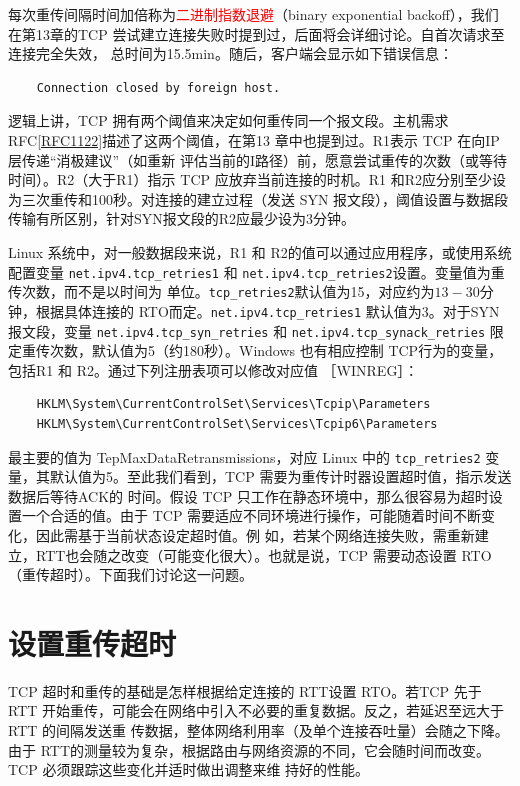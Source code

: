每次重传间隔时间加倍称为\textcolor{red}{二进制指数退避}（binary exponential backoff），我们在第13章的TCP 尝试建立连接失败时提到过，后面将会详细讨论。自首次请求至连接完全失效，
总时间为15.5min。随后，客户端会显示如下错误信息：
\begin{verbatim}
    Connection closed by foreign host.
\end{verbatim}

逻辑上讲，TCP 拥有两个阈值来决定如何重传同一个报文段。主机需求 RFC\href{https://www.rfc-editor.org/rfc/rfc1122}{[RFC1122]}描述了这两个阈值，在第13 章中也提到过。R1表示 TCP 在向IP 层传递“消极建议”（如重新
评估当前的I路径）前，愿意尝试重传的次数（或等待时间）。R2（大于R1）指示 TCP 应放弃当前连接的时机。R1 和R2应分别至少设为三次重传和100秒。对连接的建立过程（发送
SYN 报文段），阈值设置与数据段传输有所区别，针对SYN报文段的R2应最少设为3分钟。

Linux 系统中，对一般数据段来说，R1 和 R2的值可以通过应用程序，或使用系统配置变量 \verb|net.ipv4.tcp_retries1| 和 \verb|net.ipv4.tcp_retries2|设置。变量值为重传次数，而不是以时间为
单位。\verb|tcp_retries2|默认值为15，对应约为\(13-30\)分钟，根据具体连接的 RTO而定。\verb|net.ipv4.tcp_retries1| 默认值为3。对于SYN报文段，变量 \verb|net.ipv4.tcp_syn_retries|
和 \verb|net.ipv4.tcp_synack_retries| 限定重传次数，默认值为5（约180秒）。Windows 也有相应控制 TCP行为的变量，包括R1 和 R2。通过下列注册表项可以修改对应值 ［WINREG］：

\begin{verbatim}
    HKLM\System\CurrentControlSet\Services\Tcpip\Parameters
    HKLM\System\CurrentControlSet\Services\Tcpip6\Parameters
\end{verbatim}

最主要的值为 TepMaxDataRetransmissions，对应 Linux 中的 \verb|tcp_retries2| 变量，其默认值为5。至此我们看到，TCP 需要为重传计时器设置超时值，指示发送数据后等待ACK的
时间。假设 TCP 只工作在静态环境中，那么很容易为超时设置一个合适的值。由于 TCP 需要适应不同环境进行操作，可能随着时间不断变化，因此需基于当前状态设定超时值。例
如，若某个网络连接失败，需重新建立，RTT也会随之改变（可能变化很大）。也就是说，TCP 需要动态设置 RTO（重传超时）。下面我们讨论这一问题。

\section{设置重传超时}
TCP 超时和重传的基础是怎样根据给定连接的 RTT设置 RTO。若TCP 先于 RTT 开始重传，可能会在网络中引入不必要的重复数据。反之，若延迟至远大于 RTT 的间隔发送重
传数据，整体网络利用率（及单个连接吞吐量）会随之下降。由于 RTT的测量较为复杂，根据路由与网络资源的不同，它会随时间而改变。TCP 必须跟踪这些变化并适时做出调整来维
持好的性能。

